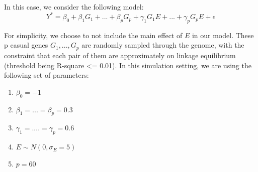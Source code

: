 \documentclass[
]{article}
\begin{document}
In this case, we consider the following model:
\[Y^* = \beta_0 + \beta_1G_1 + ... +\beta_p G_p + \gamma_1G_1E +...+\gamma_pG_pE + \epsilon\]

For simplicity, we choose to not include the main effect of \(E\) in our
model. These p casual genes \(G_1,...,G_p\) are randomly sampled through
the genome, with the constraint that each pair of them are approximately
on linkage equilibrium (threshold being R-square \textless= 0.01). In
this simulation setting, we are using the following set of parameters:

\begin{enumerate}
\item $\beta_0 = -1$
\item $\beta_1 = ... = \beta_p = 0.3$
\item $\gamma_1 = .... = \gamma_p = 0.6$
\item $E \sim N(0,\sigma_E = 5)$
\item $p = 60$
\end{enumerate}
\end{document}
